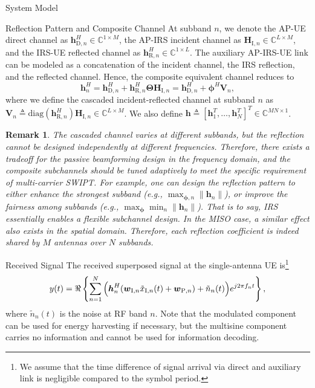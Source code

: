 \documentclass[journal]{IEEEtran}
\newtheorem{remark}{Remark}
\begin{document}
\begin{section}{System Model}
\begin{subsection}{Reflection Pattern and Composite Channel}
			At subband $n$, we denote the AP-UE direct channel as $\boldsymbol{h}_{\mathrm{D},n}^H \in \mathbb{C}^{1 \times M}$, the AP-IRS incident channel as $\boldsymbol{H}_{\mathrm{I},n} \in \mathbb{C}^{L \times M}$, and the IRS-UE reflected channel as $\boldsymbol{h}_{\mathrm{R},n}^H \in \mathbb{C}^{1 \times L}$. The auxiliary AP-IRS-UE link can be modeled as a concatenation of the incident channel, the IRS reflection, and the reflected channel. Hence, the composite equivalent channel reduces to
			\begin{equation}\label{eq:h_n}
				\boldsymbol{h}_{n}^H = \boldsymbol{h}_{\mathrm{D},n}^H + \boldsymbol{h}_{\mathrm{R},n}^H \boldsymbol{\Theta} \boldsymbol{H}_{\mathrm{I},n} = \boldsymbol{h}_{\mathrm{D},n}^H + \boldsymbol{\phi}^H \boldsymbol{V}_{n},
			\end{equation}
			where we define the cascaded incident-reflected channel at subband $n$ as $\boldsymbol{V}_{n} \triangleq \mathrm{diag}(\boldsymbol{h}_{\mathrm{R},n}^H)\boldsymbol{H}_{\mathrm{I},n} \in \mathbb{C}^{L \times M}$. We also define $\boldsymbol{h} \triangleq [\boldsymbol{h}_1^T,\dots,\boldsymbol{h}_N^T]^T \in \mathbb{C}^{MN \times 1}$.

			\begin{remark}\label{re:subband_tradeoff}
				The cascaded channel varies at different subbands, but the reflection cannot be designed independently at different frequencies. Therefore, there exists a tradeoff for the passive beamforming design in the frequency domain, and the composite subchannels should be tuned adaptively to meet the specific requirement of multi-carrier SWIPT. For example, one can design the reflection pattern to either enhance the strongest subband (e.g., $\max_{\boldsymbol{\phi},n} \lVert \boldsymbol{h}_n \rVert$), or improve the fairness among subbands (e.g., $\max_{\boldsymbol{\phi}} \min_n \lVert \boldsymbol{h}_n \rVert$). That is to say, IRS essentially enables a flexible subchannel design. In the MISO case, a similar effect also exists in the spatial domain. Therefore, each reflection coefficient is indeed shared by $M$ antennas over $N$ subbands.
			\end{remark}
		\end{subsection}


		\begin{subsection}{Received Signal}
			The received superposed signal at the single-antenna UE is\footnote{We assume that the time difference of signal arrival via direct and auxiliary link is negligible compared to the symbol period.}
			\begin{equation}
				y(t) = \Re\left\{\sum_{n=1}^N{\Bigl(\boldsymbol{h}_{n}^H}{(\boldsymbol{w}_{\mathrm{I},n}\tilde{x}_{\mathrm{I},n}(t)+\boldsymbol{w}_{\mathrm{P},n})+\tilde{n}_n(t)\Bigr)}{e^{j2{\pi}{f_n}{t}}}\right\},
			\end{equation}
			where $\tilde{n}_n(t)$ is the noise at RF band $n$. Note that the modulated component can be used for energy harvesting if necessary, but the multisine component carries no information and cannot be used for information decoding.
		\end{subsection}



\end{section}
\end{document}
